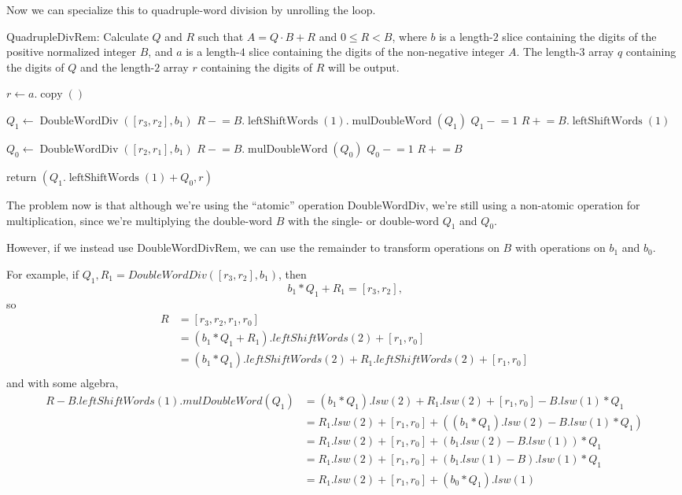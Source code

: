 \documentclass{computer-arithmetic}
\begin{document}
Now we can specialize this to quadruple-word division by unrolling the loop.

\begin{algorithm}
  \caption{QuadrupleDivRem: Calculate \(Q\) and \(R\) such that
    \(A = Q ⋅ B + R\) and \(0 ≤ R < B\), where \(b\) is a length-\(2\)
    slice containing the digits of the positive normalized integer
    \(B\), and \(a\) is a length-\(4\) slice
    containing the digits of the non-negative integer \(A\). The
    length-\(3\) array \(q\) containing the digits of \(Q\) and
    the length-\(2\) array \(r\) containing the digits of \(R\) will
    be output.}
  \begin{algorithmic}[1]
\State \(r ← a.\operatorname{copy}()\)

\State \(Q_1 ← \operatorname{DoubleWordDiv}([r_3, r_2], b_1)\)
\State \(R \mathrel{-}= B.\operatorname{leftShiftWords}(1).\operatorname{mulDoubleWord}(Q_1)\)
\State \(Q_1 \mathrel{-}= 1\)
\State \(R \mathrel{+}= B.\operatorname{leftShiftWords}(1)\)
\EndWhile

\State \(Q_0 ← \operatorname{DoubleWordDiv}([r_2, r_1], b_1)\)
\State \(R \mathrel{-}= B.\operatorname{mulDoubleWord}(Q_0)\)
\State \(Q_0 \mathrel{-}= 1\)
\State \(R \mathrel{+}= B\)
\EndWhile

\State return \((Q_1.\operatorname{leftShiftWords}(1) + Q_0, r)\)
\end{algorithmic}
\end{algorithm}

The problem now is that although we're using the ``atomic'' operation
DoubleWordDiv, we're still using a non-atomic operation for
multiplication, since we're multiplying the double-word \(B\) with the
single- or double-word \(Q_1\) and \(Q_0\).

However, if we instead use DoubleWordDivRem, we can use the remainder
to transform operations on \(B\) with operations on \(b_1\) and
\(b_0\).

For example, if \(Q_1, R_1 = DoubleWordDiv([r_3, r_2], b_1)\), then
\[
  b_1 * Q_1 + R_1 = [r_3, r_2]\text{,}
\]
so
\begin{align*}
  R &= [r_3, r_2, r_1, r_0] \\
    &= (b_1 * Q_1 + R_1).leftShiftWords(2) + [r_1, r_0] \\
    &= (b_1 * Q_1).leftShiftWords(2) + R_1.leftShiftWords(2) + [r_1, r_0] \\
\end{align*}
and with some algebra,
\begin{align*}
  R - B.leftShiftWords(1).mulDoubleWord(Q_1)
  &= (b_1 * Q_1).lsw(2) + R_1.lsw(2) + [r_1, r_0] - B.lsw(1) * Q_1 \\
  &= R_1.lsw(2) + [r_1, r_0] + ((b_1 * Q_1).lsw(2) - B.lsw(1) * Q_1) \\
  &= R_1.lsw(2) + [r_1, r_0] + (b_1.lsw(2) - B.lsw(1)) * Q_1 \\
  &= R_1.lsw(2) + [r_1, r_0] + (b_1.lsw(1) - B).lsw(1) * Q_1 \\
  &= R_1.lsw(2) + [r_1, r_0] + (b_0 * Q_1).lsw(1)
\end{align*}
\end{document}
